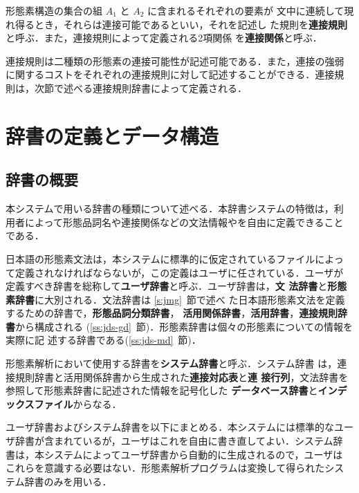 \documentclass[a4j,titlepage]{jarticle}
\begin{document}
形態素構造の集合の組 $ A_{1} $ と $ A_{2} $ に含まれるそれぞれの要素が
文中に連続して現れ得るとき，それらは連接可能であるといい，それを記述し
た規則を{\bf 連接規則}と呼ぶ．また，連接規則によって定義される2項関係
を{\bf 連接関係}と呼ぶ．

連接規則は二種類の形態素の連接可能性が記述可能である．また，連接の強弱
に関するコストをそれぞれの連接規則に対して記述することができる．連接規
則は，次節で述べる連接規則辞書によって定義される．


\section{辞書の定義とデータ構造}\label{s:jds}

\subsection{辞書の概要}
\label{ss:abst-dic}

本システムで用いる辞書の種類について述べる．本辞書システムの特徴は，利
用者によって形態品詞名や連接関係などの文法情報やを自由に定義できること
である．

日本語の形態素文法は，本システムに標準的に仮定されているファイルによっ
て定義されなければならないが，この定義はユーザに任されている．ユーザが
定義すべき辞書を総称して{\bf ユーザ辞書}と呼ぶ．ユーザ辞書は，{\bf 文
法辞書}と{\bf 形態素辞書}に大別される．文法辞書は \ref{s:jmg}~節で述べ
た日本語形態素文法を定義するための辞書で，{\bf 形態品詞分類辞書}，{\bf 
活用関係辞書}，{\bf 活用辞書}，{\bf 連接規則辞書}から構成される
(\ref{ss:jds-gd}~節)．形態素辞書は個々の形態素についての情報を実際に記
述する辞書である(\ref{ss:jds-md}~節)．

形態素解析において使用する辞書を{\bf システム辞書}と呼ぶ．システム辞書
は，連接規則辞書と活用関係辞書から生成された{\bf 連接対応表}と{\bf 連
接行列}，文法辞書を参照して形態素辞書に記述された情報を記号化した{\bf 
データベース辞書}と{\bf インデックスファイル}からなる．

ユーザ辞書およびシステム辞書を以下にまとめる．本システムには標準的なユー
ザ辞書が含まれているが，ユーザはこれを自由に書き直してよい．システム辞
書は，本システムによってユーザ辞書から自動的に生成されるので，ユーザは
これらを意識する必要はない．形態素解析プログラムは変換して得られたシス
テム辞書のみを用いる．
\end{document}
